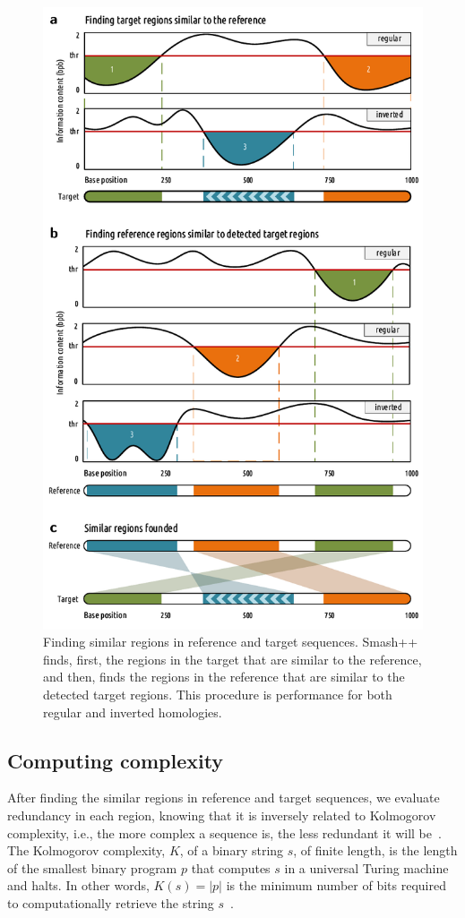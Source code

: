 \documentclass[a4paper,num-refs]{oup-contemporary}
\begin{document}
 \begin{figure}[!h]
   \centering
   \includegraphics[width=\columnwidth]{simil.pdf}
   \caption{Finding similar regions in reference and target sequences. Smash++ finds, first, the regions in the target that are similar to the reference, and then, finds the regions in the reference that are similar to the detected target regions. This procedure is performance for both regular and inverted homologies.}
   \label{fig.simil}
 \end{figure}

 \subsection{Computing complexity}
 After finding the similar regions in reference and target sequences, we evaluate redundancy in each region, knowing that it is inversely related to Kolmogorov complexity, i.e., the more complex a sequence is, the less redundant it will be~\cite{hosseini2018cryfa}. The Kolmogorov complexity, $K$, of a binary string $s$, of finite length, is the length of the smallest binary program $p$ that computes $s$ in a universal Turing machine and halts. In other words, $K(s)=|p|$ is the minimum number of bits required to computationally retrieve the string $s$~\cite{turing1936on,li2009an}.
\end{document}
